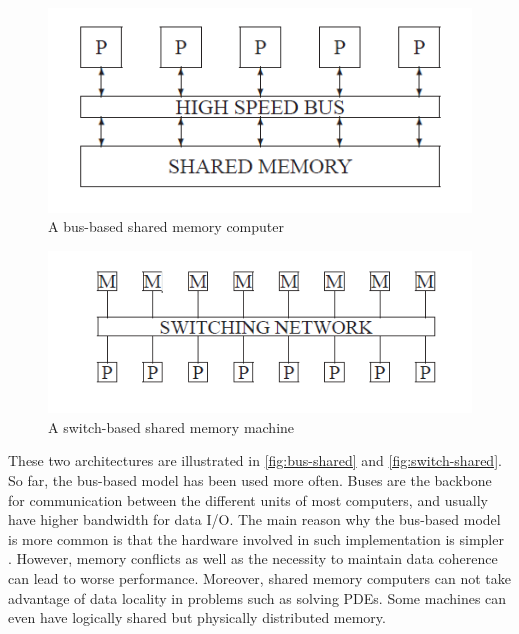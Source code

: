 \begin{figure}[h!]
    \centering
    \includegraphics[width=\linewidth]{figures/bus-based-shared-memory.png}
    \caption{A bus-based shared memory computer \cite{doi:10.1137/1.9780898718003}}
    \label{fig:bus-shared}
\end{figure}

\begin{figure}[h!]
    \centering
    \includegraphics[width=\linewidth]{figures/switch-based-shared-memory.png}
    \caption{A switch-based shared memory machine \cite{doi:10.1137/1.9780898718003}}
    \label{fig:switch-shared}
\end{figure}

These two architectures are illustrated in \autoref{fig:bus-shared} and \autoref{fig:switch-shared}. So far, the bus-based model has been used more often. Buses are the backbone for communication between the different units of most computers, and usually have higher bandwidth for data I/O. The main reason why the bus-based model is more common is that the hardware involved in such implementation is simpler \cite{adeli1987parallel}. However, memory conflicts as well as the necessity to maintain data coherence can lead to worse performance. Moreover, shared memory computers can not take advantage of data locality in problems such as solving PDEs. Some machines can even have logically shared but physically distributed memory.

